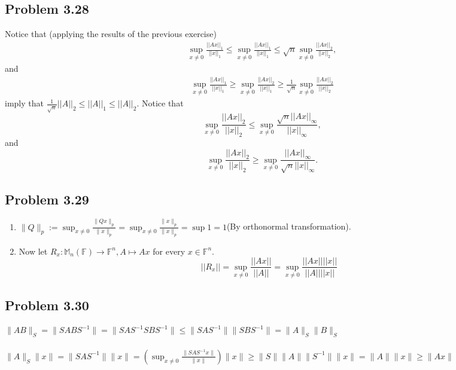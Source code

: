 \documentclass[letterpaper,12pt]{article}
\theoremstyle{definition}
\begin{document}
\begin{spacing}{1.3}{}
\begin{enumerate}
\end{enumerate}
	
\subsection*{Problem 3.28}

    Notice that (applying the results of the previous exercise)
	\begin{align*}
	\sup_{x\neq 0}\frac{||Ax||_1}{||x||_1}\leq
	\sup_{x\neq 0}\frac{||Ax||_1}{||x||_1}\leq
	\sqrt{n}\sup_{x\neq 0}\frac{||Ax||_2}{||x||_2},
	\end{align*}
	and
	\begin{align*}
	\sup_{x\neq 0}\frac{||Ax||_1}{||x||_1}\geq
	\sup_{x\neq 0}\frac{||Ax||_2}{||x||_1}\geq
	\frac{1}{\sqrt{n}}\sup_{x\neq 0}\frac{||Ax||_2}{||x||_2}
	\end{align*}
	imply that $\frac{1}{\sqrt{n}}||A||_2\leq||A||_1\leq||A||_2$.
		Notice that
	\begin{equation*}
	\sup_{x\neq 0}\frac{||Ax||_2}{||x||_2}\leq
	\sup_{x\neq 0}\frac{\sqrt{n}||Ax||_\infty}{||x||_\infty},
	\end{equation*}
	and
	\begin{equation*}
	\sup_{x\neq 0}\frac{||Ax||_2}{||x||_2}\geq
	\sup_{x\neq 0}\frac{||Ax||_\infty}{\sqrt{n}||x||_\infty}.
	\end{equation*}


\subsection*{Problem 3.29}
	\begin{enumerate}
	    \item 
	    $\|Q\|_p := \sup_{x \neq 0} \frac{\|Qx\|_p}{\|x\|_p} = \sup_{x \neq 0} \frac{\|x\|_p}{\|x\|_p} = \sup 1 = 1 $(By orthonormal transformation). \\

	\item
	Now let $R_x:\mathbb M_n(\mathbb F)\to\mathbb F^n, A\mapsto Ax$ for every $x\in\mathbb F^n$.
	\begin{equation*}
	||R_x||=\sup_{x\neq 0}\frac{||Ax||}{||A||}=
	\sup_{x\neq 0}\frac{||Ax||||x||}{||A||||x||}
	\end{equation*}
	
	\end{enumerate} 
	
	
\subsection*{Problem 3.30}
	$\|AB\|_S = \|SABS^{-1}\| = \|SAS^{-1} SBS^{-1}\| \leq \|SAS^{-1}\| \|SBS^{-1}\| = \|A\|_S \|B\|_S  $ \\\\
	$\|A\|_{S} \|x\| = \|SAS^{-1}\| \|x\| = (\sup_{x \neq 0} \frac{\|SAS^{-1} x\|}{\|x\|}) \|x\| \geq \|S\| \|A\| \|S^{-1}\| \|x\| = \|A\| \|x\| \geq \|Ax\| $ \ 
	

\end{spacing}
\end{document}
